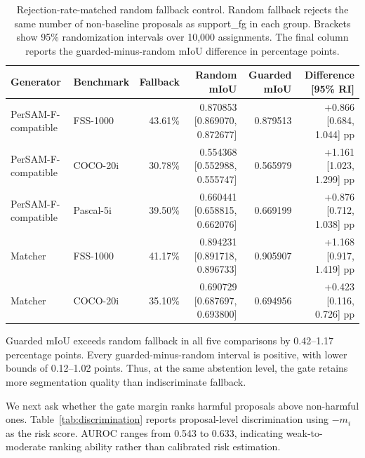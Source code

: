 \documentclass{CVM}
\begin{document}
\begin{table}[h!t]
\center
\caption{Rejection-rate-matched random fallback control. Random fallback rejects the same number of non-baseline proposals as support\_fg in each group. Brackets show 95\% randomization intervals over 10,000 assignments. The final column reports the guarded-minus-random mIoU difference in percentage points.}
\begin{tabular}{llrrrr}
\toprule
Generator & Benchmark & Fallback & Random mIoU & Guarded mIoU & Difference [95\% RI] \\
\midrule
PerSAM-F-compatible & FSS-1000 & 43.61\% & 0.870853 [0.869070, 0.872677] & 0.879513 & +0.866 [0.684, 1.044] pp \\
PerSAM-F-compatible & COCO-20i & 30.78\% & 0.554368 [0.552988, 0.555747] & 0.565979 & +1.161 [1.023, 1.299] pp \\
PerSAM-F-compatible & Pascal-5i & 39.50\% & 0.660441 [0.658815, 0.662076] & 0.669199 & +0.876 [0.712, 1.038] pp \\
Matcher & FSS-1000 & 41.17\% & 0.894231 [0.891718, 0.896733] & 0.905907 & +1.168 [0.917, 1.419] pp \\
Matcher & COCO-20i & 35.10\% & 0.690729 [0.687697, 0.693800] & 0.694956 & +0.423 [0.116, 0.726] pp \\
\bottomrule
\end{tabular}
\label{tab:random_control}
\end{table}

Guarded mIoU exceeds random fallback in all five comparisons by 0.42--1.17 percentage points. Every guarded-minus-random interval is positive, with lower bounds of 0.12--1.02 points. Thus, at the same abstention level, the gate retains more segmentation quality than indiscriminate fallback.

We next ask whether the gate margin ranks harmful proposals above non-harmful ones. Table~\ref{tab:discrimination} reports proposal-level discrimination using $-m_i$ as the risk score. AUROC ranges from 0.543 to 0.633, indicating weak-to-moderate ranking ability rather than calibrated risk estimation.
\end{document}
